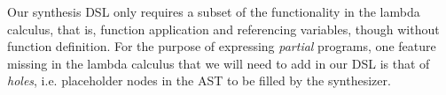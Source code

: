 \documentclass{article} %
\begin{document}

Our synthesis DSL
only requires a subset of the functionality in the lambda calculus,
that is, function application and referencing variables,
though without function definition.
%
For the purpose of expressing \emph{partial} programs,
one feature missing in the lambda calculus that we will need to add in our DSL is that of \emph{holes},
i.e. placeholder nodes in the AST to be filled by the synthesizer.
%
\end{document}
